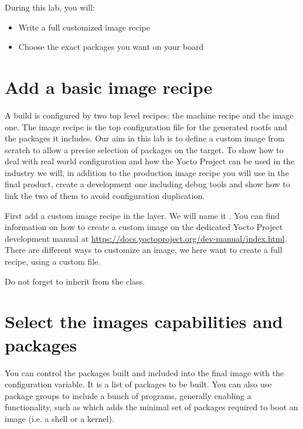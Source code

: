 
During this lab, you will:
\begin{itemize}
  \item Write a full customized image recipe
  \item Choose the exact packages you want on your board
\end{itemize}

\section{Add a basic image recipe}

A build is configured by two top level recipes: the machine recipe and the image
one. The image recipe is the top configuration file for the generated rootfs and
the packages it includes. Our aim in this lab is to define a custom image from
scratch to allow a precise selection of packages on the target. To
show how to deal with real world configuration and how the Yocto Project can be
used in the industry we will, in addition to the production image recipe you
will use in the final product, create a development one including debug tools
and show how to link the two of them to avoid configuration duplication.

First add a custom image recipe in the  layer. We will name it
. You can find information on how to create a custom
image on the dedicated Yocto Project development manual at
\url{https://docs.yoctoproject.org/dev-manual/index.html}. There
are different ways to customize an image, we here want to create a full recipe,
using a custom  file.

Do not forget to inherit from the  class.

\section{Select the images capabilities and packages}

You can control the packages built and included into the final image with the
 configuration variable. It is a list of packages to be
built. You can also use package groups to include a bunch of programs, generally
enabling a functionality, such as  which adds the
minimal set of packages required to boot an image (i.e. a shell or a kernel).

